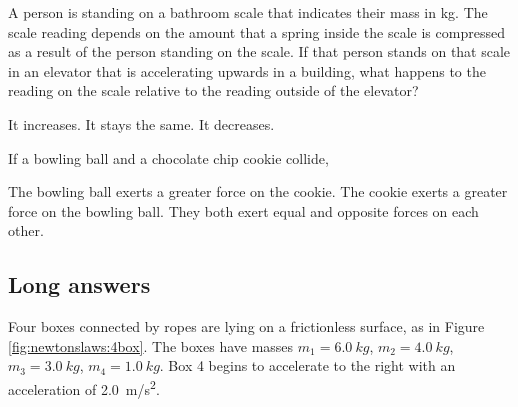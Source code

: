 \question A person is standing on a bathroom scale that indicates their mass in \si{kg}. The scale reading depends on the amount that a spring inside the scale is compressed as a result of the person standing on the scale. If that person stands on that scale in an elevator that is accelerating upwards in a building, what happens to the reading on the scale relative to the reading outside of the elevator?
\begin{checkboxes}
\CorrectChoice It increases.
\choice It stays the same.
\choice It decreases.
\end{checkboxes}

\question If a bowling ball and a chocolate chip cookie collide,
\begin{checkboxes}
\choice The bowling ball exerts a greater force on the cookie.
\choice The cookie exerts a greater force on the bowling ball.
\CorrectChoice They both exert equal and opposite forces on each other.
\end{checkboxes}


%
%
\subsection{Long answers}
\question Four boxes connected by ropes are lying on a frictionless surface, as in Figure \ref{fig:newtonslaws:4box}. The boxes have masses $m_1=\SI{6.0}{kg}$, $m_2=\SI{4.0}{kg}$, $m_3=\SI{3.0}{kg}$, $m_4=\SI{1.0}{kg}$.  Box 4 begins to accelerate to the right with an acceleration of \SI{2.0}{m/s^2}.


